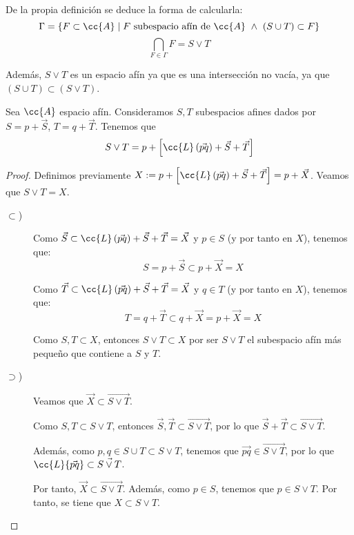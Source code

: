 De la propia definición se deduce la forma de calcularla:
$$\Gamma=\{F\subset \cc{A}\mid F \text{ subespacio afín de } \cc{A} ~\land~ (S\cup T)\subset F\}$$
$$\bigcap_{F\in \Gamma} F = S\vee T$$

Además, $S\vee T$ es un espacio afín ya que es una intersección no vacía, ya que $(S\cup T)\subset (S\vee T)$.

\begin{prop}
    Sea $\cc{A}$ espacio afín. Consideramos $S,T$ subespacios afines dados por $S=p+\vec{S}$, $T=q+\vec{T}$. Tenemos que
    $$S\vee T = p+\left[\cc{L}\left(\vec{pq}\right) + \vec{S} + \vec{T}\right]$$
\end{prop}
\begin{proof}Definimos previamente $X:=p+\left[\cc{L}\left(\vec{pq}\right) + \vec{S} + \vec{T}\right]=p+\vec{X}$. Veamos que $S\vee T=X$.
    \begin{description}
        \item[$\subset$)] 
            Como $\vec{S}\subset \cc{L}\left(\vec{pq}\right) + \vec{S} + \vec{T}=\vec{X}$ y $p\in S$ (y por tanto en $X$), tenemos que:
            \begin{equation*}
                S=p+\vec{S}\subset p+ \vec{X} = X
            \end{equation*}

            Como $\vec{T}\subset \cc{L}\left(\vec{pq}\right) + \vec{S} + \vec{T}=\vec{X}$ y $q\in T$ (y por tanto en $X$), tenemos que:
            \begin{equation*}
                T=q+\vec{T}\subset q+ \vec{X} = p+ \vec{X} = X
            \end{equation*}

            Como $S,T\subset X$, entonces $S\vee T\subset X$ por ser $S\vee T$ el subespacio afín más pequeño que contiene a $S$ y $T$.
            
        \item[$\supset$)] Veamos que $\vec{X}\subset \vec{S\vee T}$.

        Como $S,T\subset S\vee T$, entonces $\vec{S},\vec{T}\subset \vec{S\vee T}$, por lo que $\vec{S}+\vec{T}\subset \vec{S\vee T}$.
        
        Además, como $p,q\in S\cup T\subset S\vee T$, tenemos que $\vec{pq}\in \vec{S\vee T}$, por lo que $\cc{L}\{\vec{pq}\}\subset \vec{S\vee T}$.

        Por tanto, $\vec{X}\subset \vec{S\vee T}$. Además, como $p\in S$, tenemos que $p\in S\vee T$. Por tanto, se tiene que $X\subset S\vee T$.
    \end{description}
\end{proof}

